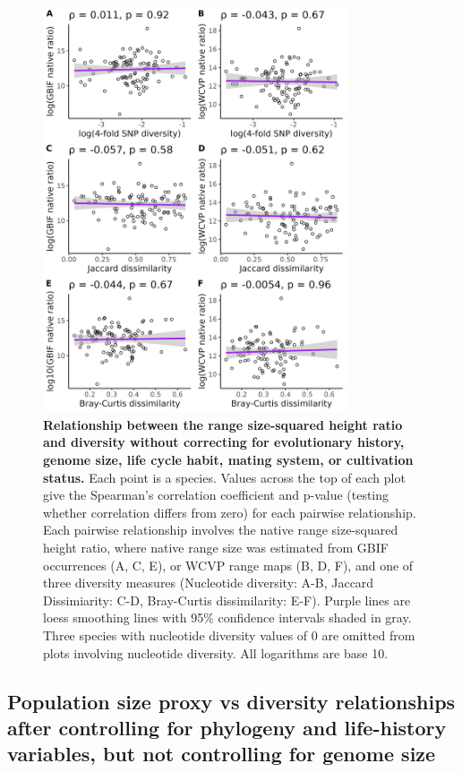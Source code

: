 \documentclass[12pt]{article}
\begin{document}
\begin{figure}[H]
    \centering
    \includegraphics[width=0.8\textwidth]{figures/appendix_d/diversity_vs_popsize_2024-12-12.jpg}
    \caption{\textbf{Relationship between the range size-squared height ratio and diversity without correcting for evolutionary history, genome size, life cycle habit, mating system, or cultivation status.} Each point is a species. Values across the top of each plot give the Spearman's correlation coefficient and p-value (testing whether correlation differs from zero) for each pairwise relationship. Each pairwise relationship involves the native range size-squared height ratio, where native range size was estimated from GBIF occurrences (A, C, E), or WCVP range maps (B, D, F), and one of three diversity measures (Nucleotide diversity: A-B, Jaccard Dissimiarity: C-D, Bray-Curtis dissimilarity: E-F). Purple lines are loess smoothing lines with 95\% confidence intervals shaded in gray. Three species with nucleotide diversity values of 0 are omitted from plots involving nucleotide diversity. All logarithms are base 10.}
\end{figure}

\subsection*{Population size proxy vs diversity relationships after controlling for phylogeny and life-history variables, but not controlling for genome size}
\end{document}

